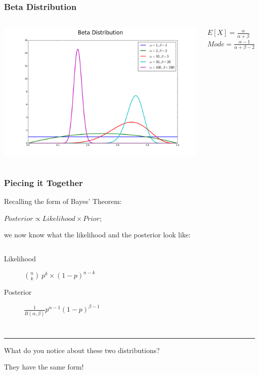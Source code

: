 \documentclass{beamer}
\begin{document}
\begin{frame}
  \frametitle{Beta Distribution}
  \begin{columns}
      \includegraphics[width=\textwidth]{images/betas.png}
    \begin{columns}
        \centering
        $E[X] = \frac{\alpha}{\alpha+\beta}$
        \centering
        $Mode = \frac{\alpha-1}{\alpha+\beta-2}$
    \end{columns}
  \end{columns}
\end{frame}

\begin{frame}
  \frametitle{Piecing it Together}
  Recalling the form of Bayes' Theorem:
  \begin{center}
    $ Posterior \propto Likelihood \times Prior $;
  \end{center}
  we now know what the likelihood and the posterior look like: \vspace{2mm}
  \begin{columns}
    \begin{description}
      \item[Likelihood] $ {{n}\choose{k}}\: p^k \times (1-p)^{n-k} $ \vspace{2mm}
      \item[Posterior] $ \frac{1}{B(\alpha, \beta)} p^{\alpha-1}(1-p)^{\beta-1} $
    \end{description}
  \end{columns} \vspace{3mm}
  \pause
  \noindent\hfil\rule{\textwidth}{.4pt}\hfil \vspace{1mm}
  \begin{center}
    What do you notice about these two distributions? \pause
    \vspace{2mm}

    {\large They have the same form!}
  \end{center}
\end{frame}
\end{document}
